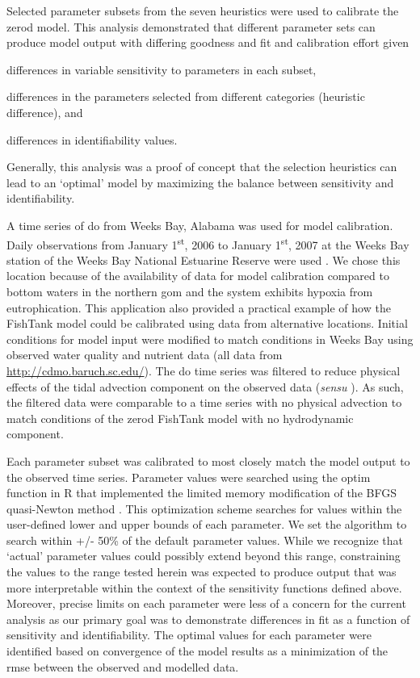 \documentclass[review]{elsarticle}\usepackage[]{graphicx}\usepackage[]{color}
\begin{document}
Selected parameter subsets from the seven heuristics were used to calibrate the \ac{zerod} model.  This analysis demonstrated that different parameter sets can produce model output with differing goodness and fit and calibration effort given
\begin{inparaenum}[1\upshape)]
\item differences in variable sensitivity to parameters in each subset, 
\item differences in the parameters selected from different categories (heuristic difference), and 
\item differences in identifiability values.
\end{inparaenum}
Generally, this analysis was a proof of concept that the selection heuristics can lead to an `optimal' model by maximizing the balance between sensitivity and identifiability.  

A time series of \ac{do} from Weeks Bay, Alabama was used for model calibration.  Daily observations from January 1\textsuperscript{st},  2006 to January 1\textsuperscript{st}, 2007 at the Weeks Bay station of the Weeks Bay National Estuarine Reserve were used \citep{Wenner04}.  We chose this location because of the availability of data for model calibration compared to bottom waters in the northern \ac{gom} and the system exhibits hypoxia from eutrophication.  This application also provided a practical example of how the FishTank model could be calibrated using data from alternative locations.  Initial conditions for model input were modified to match conditions in Weeks Bay using observed water quality and nutrient data (all data from \url{http://cdmo.baruch.sc.edu/}).  The \ac{do} time series was filtered to reduce physical effects of the tidal advection component on the observed data (\textit{sensu} \citealt{Beck15b}).  As such, the filtered data were comparable to a time series with no physical advection to match conditions of the \ac{zerod} FishTank model with no hydrodynamic component. 

Each parameter subset was calibrated to most closely match the model output to the observed time series.  Parameter values were searched using the optim function in R that implemented the limited memory modification of the BFGS quasi-Newton method \citep{Byrd95,Nocedal06,RDCT17}.  This optimization scheme searches for values within the user-defined lower and upper bounds of each parameter.  We set the algorithm to search within +/- 50\% of the default parameter values.  While we recognize that `actual' parameter values could possibly extend beyond this range, constraining the values to the range tested herein was expected to produce output that was more interpretable within the context of the sensitivity functions defined above.  Moreover, precise limits on each parameter were less of a concern for the current analysis as our primary goal was to demonstrate differences in fit as a function of sensitivity and identifiability.  The optimal values for each parameter were identified based on convergence of the model results as a minimization of the \ac{rmse} between the observed and modelled data.    
\end{document}
